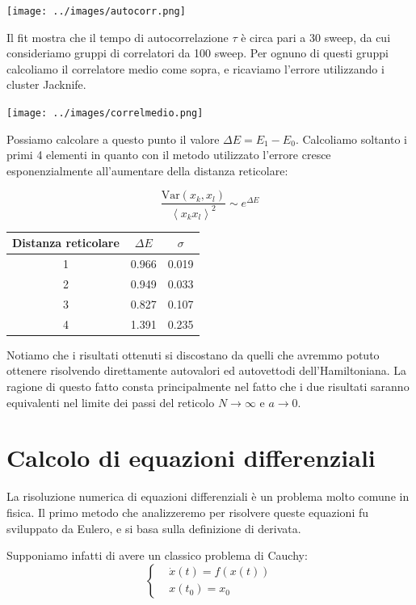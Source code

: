 \documentclass[a4paper,10pt]{article}
\begin{document}
\begin{center}
 \texttt{[image: ../images/autocorr.png]}
\end{center}

Il fit mostra che il tempo di autocorrelazione $\tau$ è circa pari a 30 sweep, da cui consideriamo gruppi di correlatori da 100 sweep. Per ognuno di questi gruppi calcoliamo il correlatore medio come sopra, e ricaviamo l'errore utilizzando i cluster Jacknife.

\begin{center}
 \texttt{[image: ../images/correlmedio.png]}
\end{center}

Possiamo calcolare a questo punto il valore $\Delta E=E_1-E_0$. Calcoliamo soltanto i primi 4 elementi in quanto con il metodo utilizzato l'errore cresce esponenzialmente all'aumentare della distanza reticolare:

$$\frac{\text{Var}(x_k, x_l)}{\left<x_k x_l\right>^2} \sim e^{\Delta E}$$

\begin{center}
\begin{tabular}{c|c|c}
\hline
Distanza reticolare & $\Delta E$ & $\sigma$ \\
\hline
1 & 0.966 & 0.019\\
2&0.949&0.033 \\
3&0.827 &0.107 \\
4&1.391 &0.235 \\
\hline
\end{tabular}
\end{center}

Notiamo che i risultati ottenuti si discostano da quelli che avremmo potuto ottenere risolvendo direttamente autovalori ed autovettodi dell'Hamiltoniana. La ragione di questo fatto consta principalmente nel fatto che i due risultati saranno equivalenti nel limite dei passi del reticolo $N\to\infty$ e $a\to0$.


\section{Calcolo di equazioni differenziali}

La risoluzione numerica di equazioni differenziali è un problema molto comune in fisica. Il primo metodo che analizzeremo per risolvere queste equazioni fu sviluppato da Eulero, e si basa sulla definizione di derivata.

Supponiamo infatti di avere un classico problema di Cauchy:
$$
\begin{cases}
&\dot{x}(t)=f(x(t)) \\
&x(t_0) = x_0
\end{cases}
$$
\end{document}
